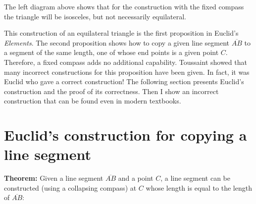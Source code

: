 The left diagram above shows that for the construction with the fixed compass the triangle will be isosceles, but not necessarily equilateral.

This construction of an equilateral triangle is the first proposition in Euclid's \emph{Elements}. The second proposition shows how to copy a given line segment $\overline{AB}$ to a segment of the same length, one of whose end points is a given point $C$. Therefore, a fixed compass adds no additional capability. Toussaint \cite{toussaint} showed that many incorrect constructions for this proposition have been given. In fact, it was Euclid who gave a correct construction! The following section presents Euclid's construction and the proof of its correctness. Then I show an incorrect construction that can be found even in modern textbooks.

\section{Euclid's construction for copying a line segment}

\textbf{Theorem:} Given a line segment $\overline{AB}$ and a point $C$, a line segment can be constructed (using a collapsing compass) at $C$ whose length is equal to the length of $\overline{AB}$:

\begin{center}
\end{center}

